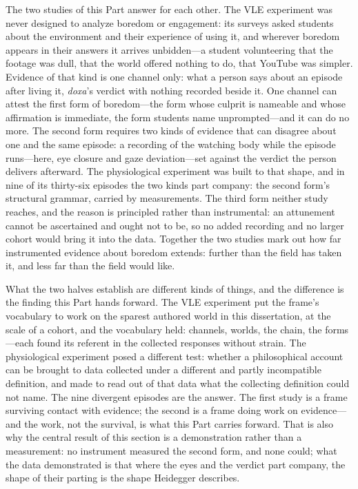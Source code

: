 The two studies of this Part answer for each other. The VLE experiment was never designed
to analyze boredom or engagement: its surveys asked
students about the environment and their experience of using it, and wherever boredom
appears in their answers it arrives unbidden---a student volunteering that the footage was
dull, that the world offered nothing to do, that YouTube was simpler. Evidence of that kind
is one channel only: what a person says about an episode after living it, \textit{doxa}'s
verdict with nothing recorded beside it. One channel can attest the first form of
boredom---the form whose culprit is nameable and whose affirmation is immediate, the form
students name unprompted---and it can do no more. The second form requires two kinds of
evidence that can disagree about one and the same episode: a recording of the watching body
while the episode runs---here, eye closure and gaze deviation---set against the verdict the
person delivers afterward. The physiological experiment was built to that shape, and in nine
of its thirty-six episodes the two kinds part company: the second form's structural grammar,
carried by measurements. The third form neither study reaches, and the reason is principled
rather than instrumental: an attunement cannot be ascertained and ought not to be, so no
added recording and no larger cohort would bring it into the data. Together the two studies
mark out how far instrumented evidence about boredom extends: further than the field has
taken it, and less far than the field would like.

What the two halves establish are different kinds of things, and the difference is the
finding this Part hands forward. The VLE experiment put the frame's vocabulary to work on the
sparest authored world in this dissertation, at the scale of a cohort, and the vocabulary
held: channels, worlds, the chain, the forms---each found its referent in the collected
responses without strain. The physiological experiment posed a different test: whether a
philosophical account can be brought to data collected under a different and partly
incompatible definition, and made to read out of that data what the collecting definition
could not name. The nine divergent episodes are the answer. The first study is a frame
surviving contact with evidence; the second is a frame doing work on evidence---and the work,
not the survival, is what this Part carries forward. That is also why the central result of
this section is a demonstration rather than a measurement: no instrument measured the second
form, and none could; what the data demonstrated is that where the eyes and the verdict part
company, the shape of their parting is the shape Heidegger describes.

